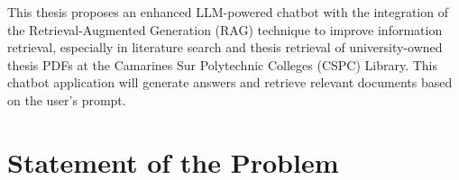 \begin{refsection}
\bigbreak
\hspace{0.4cm}This thesis proposes an enhanced LLM-powered chatbot with the integration of the Retrieval-Augmented Generation (RAG) technique to improve information retrieval, especially in literature search and thesis retrieval of university-owned thesis PDFs at the Camarines Sur Polytechnic Colleges (CSPC) Library. This chatbot application will generate answers and retrieve relevant documents based on the user's prompt.




\section{Statement of the Problem}


\end{refsection}
